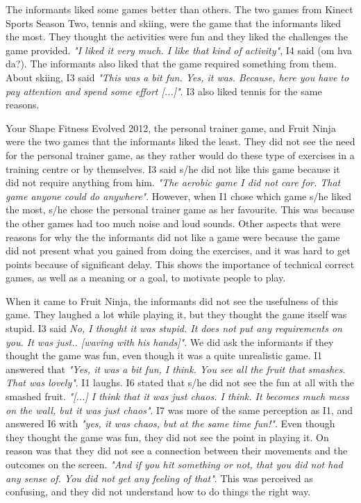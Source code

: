 The informants liked some games better than others. The two games from Kinect Sports Season Two, tennis and skiing, were the game that the informants liked the most. They thought the activities were fun and they liked the challenges the game provided. \emph{"I liked it very much. I like that kind of activity"}, I4 said (om hva da?). The informants also liked that the game required something from them. About skiing, I3 said \emph{"This was a bit fun. Yes, it was. Because, here you have to pay attention and spend some effort [...]"}. I3 also liked tennis for the same reasons.  

Your Shape Fitness Evolved 2012, the personal trainer game, and Fruit Ninja were the two games that the informants liked the least. They did not see the need for the personal trainer game, as they rather would do these type of exercises in a training centre or by themselves. I3 said s/he did not like this game because it did not require anything from him. \emph{"The aerobic game I did not care for. That game anyone could do anywhere"}. However, when I1 chose which game s/he liked the most, s/he chose the personal trainer game as her favourite. This was because the other games had too much noise and loud sounds. Other aspects that were reasons for why the the informants did not like a game were because the game did not present what you gained from doing the exercises, and it was hard to get points because of significant delay. This shows the importance of technical correct games, as well as a meaning or a goal, to motivate people to play. 

When it came to Fruit Ninja, the informants did not see the usefulness of this game. They laughed a lot while playing it, but they thought the game itself was stupid. I3 said \emph{No, I thought it was stupid. It does not put any requirements on you. It was just.. [waving with his hands]"}. We did ask the informants if they thought the game was fun, even though it was a quite unrealistic game. I1 answered that \emph{"Yes, it was a bit fun, I think. You see all the fruit that smashes. That was lovely"}. I1 laughs. I6 stated that s/he did not see the fun at all with the smashed fruit. \emph{"[...] I think that it was just chaos. I think. It becomes much mess on the wall, but it was just chaos"}. I7 was more of the same perception as I1, and answered I6 with \emph{"yes, it was chaos, but at the same time fun!"}. Even though they thought the game was fun, they did not see the point in playing it. On reason was that they did not see a connection between their movements and the outcomes on the screen. \emph{"And if you hit something or not, that you did not had any sense of. You did not get any feeling of that"}. This was perceived as confusing, and they did not understand how to do things the right way. 

